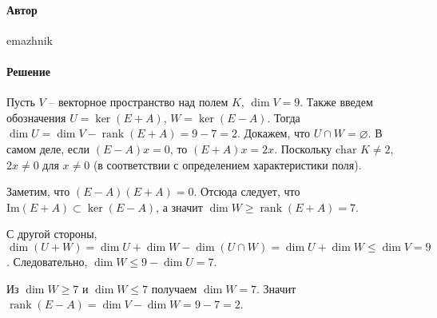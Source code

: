 \documentclass{article}
\DeclareMathOperator{\rank}{rank}
\begin{document}
\paragraph{Автор} emazhnik
\paragraph{Решение} Пусть $V$ -- векторное пространство над полем $K$, $\dim V = 9$.
Также введем обозначения  $U = \ker (E+A)$, $W = \ker (E-A)$. Тогда $\dim U = \dim V - \rank (E+A) = 9 - 7 = 2$.
Докажем, что $U \cap W = \varnothing$. В самом деле, если $(E-A)x = 0$, то $(E+A)x = 2x$. Поскольку $\text{char } K \neq 2$, $2x \neq 0$ для $x \neq 0$ (в соответствии с определением характеристики поля). 

Заметим, что $(E-A)(E+A)=0$. Отсюда следует, что $\text{Im}(E+A) \subset \ker (E-A)$, а значит $\dim W \geq \rank (E+A)=7$.

С другой стороны, $\dim (U+W) = \dim U + \dim W - \dim (U \cap W) = \dim U + \dim W \leq \dim V = 9$. Следовательно, $\dim W \leq 9 - \dim U = 7$.

Из $\dim W \geq 7$ и $\dim W \leq 7$ получаем $\dim W = 7$. Значит $\rank (E-A) = \dim V - \dim W = 9 - 7 = 2$.
\end{document}
